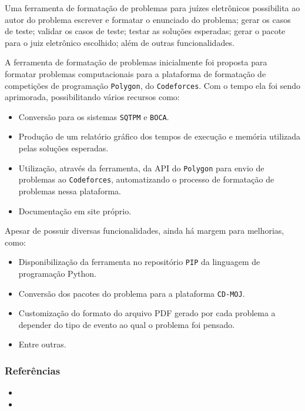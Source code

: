 \documentclass{article}
\newcommand{\polygon}{\texttt{Polygon}\xspace}
\newcommand{\codeforces}{\texttt{Codeforces}\xspace}
\newcommand{\sqtpm}{\texttt{SQTPM}\xspace}
\newcommand{\boca}{\texttt{BOCA}\xspace}
\newcommand{\pip}{\texttt{PIP}\xspace}
\newcommand{\cdmoj}{\texttt{CD-MOJ}\xspace}
\begin{document}
Uma ferramenta de formatação de problemas para juízes eletrônicos possibilita ao autor do problema escrever e formatar o enunciado do problema; gerar os casos de teste; validar os casos de teste; testar as soluções esperadas;  gerar o pacote para o juiz eletrônico escolhido; além de outras funcionalidades.

A ferramenta de formatação de problemas  inicialmente foi proposta para formatar problemas computacionais para a plataforma de formatação de competições de programação \polygon, do \codeforces. Com o tempo ela foi sendo aprimorada, possibilitando vários recursos como:

\begin{itemize}
	\item Conversão para os sistemas \sqtpm e \boca.
	\item Produção de um relatório gráfico dos tempos de execução e memória utilizada pelas soluções esperadas.
	\item Utilização, através da ferramenta, da API do \polygon para envio de problemas ao \codeforces, automatizando o processo de formatação de problemas nessa plataforma.
	\item Documentação em site próprio.
\end{itemize}

Apesar de possuir diversas funcionalidades, ainda há margem para melhorias, como:

\begin{itemize}
	\item Disponibilização da ferramenta no repositório \pip da linguagem de programação Python.
	\item Conversão dos pacotes do problema para a plataforma \cdmoj.
	\item Customização do formato do arquivo PDF gerado por cada problema a depender do tipo de evento ao qual o problema foi pensado.
	\item Entre outras.
\end{itemize}


\subsubsection*{Referências}

\begin{itemize}
	\item {}
	\item {}
\end{itemize}
\end{document}
